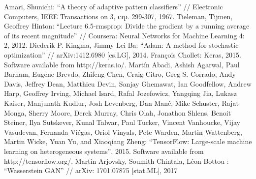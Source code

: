 \documentclass[a4paper]{article}
\begin{document}
\begin{thebibliography}{99}
		 Amari, Shunichi: ``A theory of adaptive pattern classifiers'' // Electronic Computers, IEEE Transactions on 3, стр. 299-307, 1967.
		 Tieleman, Tijmen, Geoffrey Hinton: ``Lecture 6.5-rmsprop: Divide the gradient by a running average of its recent magnitude'' // Coursera: Neural Networks for Machine Learning 4: 2, 2012.
		 Diederik P. Kingma, Jimmy Lei Ba: ``Adam: A method for stochastic optimization'' // arXiv:1412.6980 [cs.LG], 2014.
		 François Chollet: Keras, 2015. Software available from http://keras.io/.
		 Martín Abadi, Ashish Agarwal, Paul Barham, Eugene Brevdo, Zhifeng Chen, Craig Citro, Greg S. Corrado, Andy Davis, Jeffrey Dean, Matthieu Devin, Sanjay Ghemawat, Ian Goodfellow, Andrew Harp, Geoffrey Irving, Michael Isard, Rafal Jozefowicz, Yangqing Jia, Lukasz Kaiser, Manjunath Kudlur, Josh Levenberg, Dan Mané, Mike Schuster, Rajat Monga, Sherry Moore, Derek Murray, Chris Olah, Jonathon Shlens, Benoit Steiner, Ilya Sutskever, Kunal Talwar, Paul Tucker, Vincent Vanhoucke, Vijay Vasudevan, Fernanda Viégas, Oriol Vinyals, Pete Warden, Martin Wattenberg, Martin Wicke, Yuan Yu, and Xiaoqiang Zheng: ``TensorFlow: Large-scale machine learning on heterogeneous systems'', 2015. Software available from http://tensorflow.org/.
		 Martin Arjovsky, Soumith Chintala, Léon Bottou : ``Wasserstein GAN'' // arXiv: 1701.07875 [stat.ML], 2017
	\end{thebibliography}
	
\end{document}
